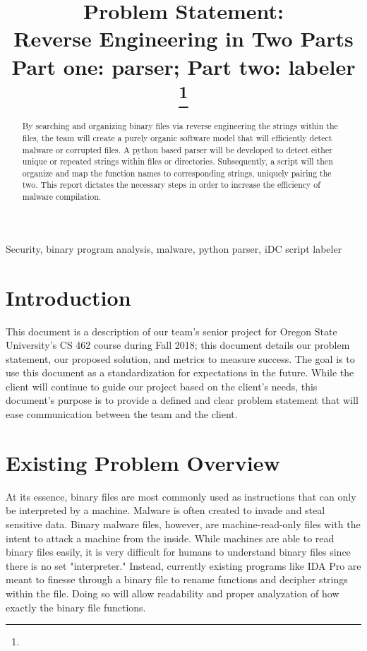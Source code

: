 \documentclass[journal,12pt,onecolumn,draftclsnofoot,]{IEEEtran}
\begin{document}
\title{Problem Statement: \\ Reverse Engineering in Two Parts\\
{\footnotesize \textsuperscript{}Part one: parser; Part two: labeler}
\thanks{}
}

\author{
}
\maketitle

\begin{abstract}
By searching and organizing binary files via reverse engineering the strings within the files, the team will create a purely organic software model that will efficiently detect malware or corrupted files. A python based parser will be developed to detect either unique or repeated strings within files or directories. Subsequently, a script will then organize and map the function names to corresponding strings, uniquely pairing the two. This report dictates the necessary steps in order to increase the efficiency of malware compilation.
\end{abstract}

\begin{IEEEkeywords}
Security, binary program analysis, malware, python parser, iDC script labeler
\end{IEEEkeywords}

\section{Introduction}
This document is a description of our team's senior project for Oregon State University's CS 462 course during Fall 2018; this document details our problem statement, our proposed solution, and  metrics to measure success. The goal is to use this document as a standardization for expectations in the future. While the client will continue to guide our project based on the client's needs, this document's purpose is to provide a defined and clear problem statement that will ease communication between the team and the client. 

\section{Existing Problem Overview}
At its essence, binary files are most commonly used as instructions that can only be interpreted by a machine. Malware is often created to invade and steal sensitive data. Binary malware files, however, are machine-read-only files with the intent to attack a machine from the inside. While machines are able to read binary files easily, it is very difficult for humans to understand binary files since there is no set "interpreter." Instead, currently existing programs like IDA Pro are meant to finesse through a binary file to rename functions and decipher strings within the file. Doing so will allow readability and proper analyzation of how exactly the binary file functions.
\end{document}
